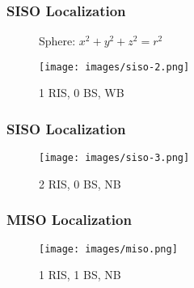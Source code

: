\documentclass{beamer}
\begin{document}
\begin{frame}
	\frametitle{SISO Localization}
	\begin{minipage}{.6\linewidth}
		\begin{figure}
			\centering
			\begin{adjustbox}{scale=.6}
			\end{adjustbox}
			\caption{Sphere:
				${x^2} + {y^2} + {z^2} = r^2$
			}
		\end{figure}
		
	\end{minipage}\hfill
	\begin{minipage}{.3\linewidth}
		\begin{figure}
			\centering
			\texttt{[image: images/siso-2.png]}
			\caption{1 RIS, 0 BS, WB}
			\label{fig:siso-2}
		\end{figure}
	\end{minipage}
\end{frame}


\begin{frame}
	\frametitle{SISO Localization}
	\begin{minipage}{.6\linewidth}
		

		
	\end{minipage}\hfill
	\begin{minipage}{.4\linewidth}
		\begin{figure}
			\centering
			\texttt{[image: images/siso-3.png]}
			\caption{2 RIS, 0 BS, NB}
			\label{fig:siso-3}
		\end{figure}
	\end{minipage}
\end{frame}



\begin{frame}
	\frametitle{MISO Localization}
	\begin{minipage}{.5\linewidth}
		
		
		
	\end{minipage}\hfill
	\begin{minipage}{.45\linewidth}
		\begin{figure}
			\centering
			\texttt{[image: images/miso.png]}
			\caption{1 RIS, 1 BS, NB}
			\label{fig:miso}
		\end{figure}
	\end{minipage}
\end{frame}
\end{document}
